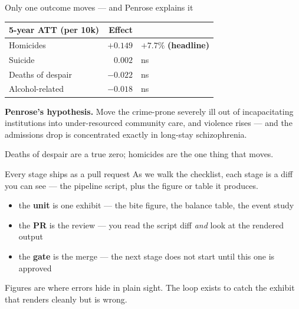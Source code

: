 \documentclass[aspectratio=169,11pt]{beamer}
\begin{document}
\begin{frame}{Only one outcome moves --- and Penrose explains it}
\begin{center}
\small
\begin{tabular}{@{}lrl@{}}
\toprule
5-year ATT (per 10k) & Effect & \\
\midrule
Homicides & $+0.149$ & $+7.7\%$\; \textbf{(headline)} \\
Suicide & $0.002$ & ns \\
Deaths of despair & $-0.022$ & ns \\
Alcohol-related & $-0.018$ & ns \\
\bottomrule
\end{tabular}
\end{center}
\vspace{0.2cm}

\textbf{Penrose's hypothesis.} Move the crime-prone severely ill out of incapacitating institutions into under-resourced community care, and violence rises --- and the admissions drop is concentrated exactly in long-stay schizophrenia.
\vspace{0.15cm}

\alert{Deaths of despair are a true zero; homicides are the one thing that moves.}
\end{frame}

\begin{frame}{Every stage ships as a pull request}
As we walk the checklist, each stage is a diff you can see --- the pipeline script, plus the figure or table it produces.
\vspace{0.25cm}
\begin{itemize}\setlength\itemsep{0.22em}
    \item the \textbf{unit} is one exhibit --- the bite figure, the balance table, the event study
    \item the \textbf{PR} is the review --- you read the script diff \emph{and} look at the rendered output
    \item the \textbf{gate} is the merge --- the next stage does not start until this one is approved
\end{itemize}
\vspace{0.2cm}

\alert{Figures are where errors hide in plain sight. The loop exists to catch the exhibit that renders cleanly but is wrong.}
\end{frame}
\end{document}
